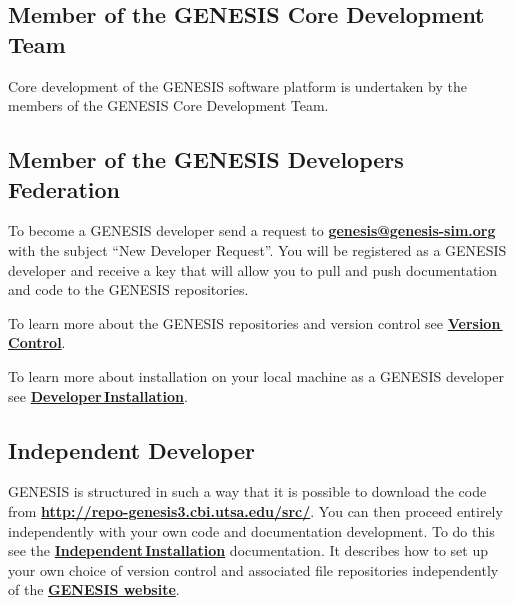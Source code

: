 \documentclass[12pt]{article}
\begin{document}
\subsection*{Member of the GENESIS Core Development Team}

Core development of the GENESIS software platform is undertaken by the members of the GENESIS Core Development Team.

\subsection*{Member of the GENESIS Developers Federation}

To become a GENESIS developer send a request to \href{mailto:genesis@genesis-sim.org}{\bf genesis@genesis-sim.org} with the subject ``New Developer Request''. You will be registered as a GENESIS developer and receive a key that will allow you to pull and push documentation and code to the GENESIS repositories.

To learn more about the GENESIS repositories and version control see \href{../version-control/version-control.tex}{\bf Version\,Control}.
	
To learn more about installation on your local machine as a GENESIS developer see \href{../installation-developer/installation-developer.tex}{\bf Developer\,Installation}.

\subsection*{\bf Independent Developer}

GENESIS is structured in such a way that it is possible to download the code from \href{http://repo-genesis3.cbi.utsa.edu/src/}{\bf http://repo-genesis3.cbi.utsa.edu/src/}. You can then proceed entirely independently with your own code and documentation development. To do this see the \href{../installation-independent/installation-independent.tex}{\bf Independent\,Installation} documentation. It describes how to set up your own choice of version control and associated file repositories independently of the \href{http://www.genesis-sim.org/}{\bf GENESIS website}.



\end{document}
